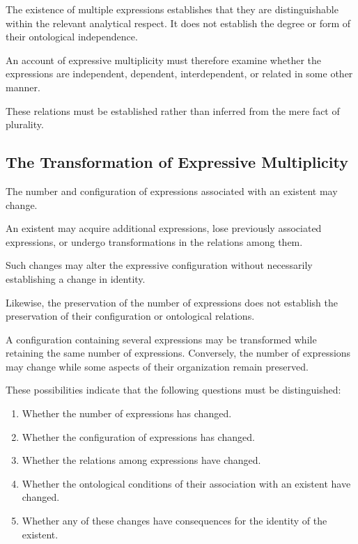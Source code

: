 The existence of multiple expressions establishes
that they are distinguishable within the
relevant analytical respect. It does not
establish the degree or form of their
ontological independence.

An account of expressive multiplicity must
therefore examine whether the expressions
are independent, dependent, interdependent,
or related in some other manner.

These relations must be established rather
than inferred from the mere fact of plurality.

\subsection{The Transformation of Expressive Multiplicity}

The number and configuration of expressions
associated with an existent may change.

An existent may acquire additional expressions,
lose previously associated expressions,
or undergo transformations in the relations
among them.

Such changes may alter the expressive
configuration without necessarily establishing
a change in identity.

Likewise, the preservation of the number
of expressions does not establish the
preservation of their configuration or
ontological relations.

A configuration containing several expressions
may be transformed while retaining the same
number of expressions. Conversely, the number
of expressions may change while some aspects
of their organization remain preserved.

These possibilities indicate that the following
questions must be distinguished:

\begin{enumerate}
    \item Whether the number of expressions
    has changed.

    \item Whether the configuration of expressions
    has changed.

    \item Whether the relations among expressions
    have changed.

    \item Whether the ontological conditions
    of their association with an existent
    have changed.

    \item Whether any of these changes have
    consequences for the identity of the
    existent.
\end{enumerate}

